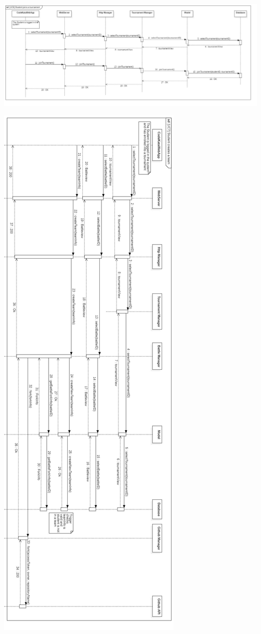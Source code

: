 \documentclass{article}
\begin{document}
\newpage
\begin{center}
    \includegraphics[angle=-90,width=0.53\linewidth]{uc6.jpg}
  \label{fig:uc6}
\end{center}

\newpage
\begin{center}
    \includegraphics[angle=-90,width=0.43\linewidth]{uc7.jpg}
  \label{fig:uc7}
\end{center}
\end{document}
